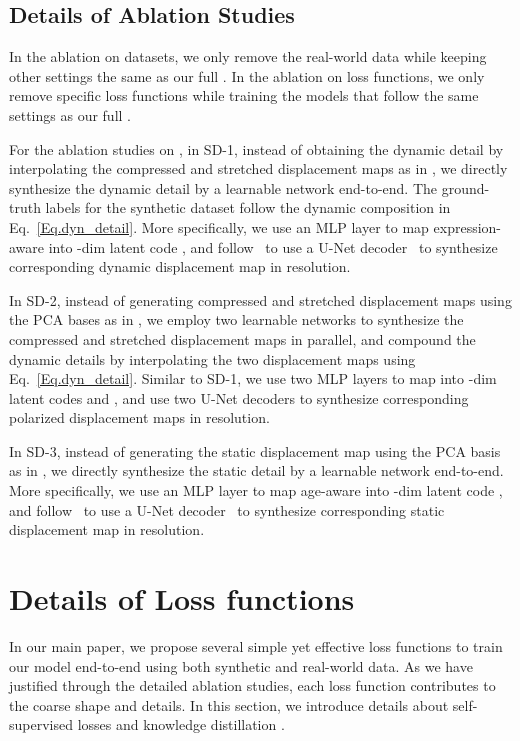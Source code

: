 \subsection{Details of Ablation Studies}


In the ablation on datasets, we only remove the real-world data while keeping other settings the same as our full {\name}. In the ablation on loss functions, we only remove specific loss functions while training the models that follow the same settings as our full {\name}.


For the ablation studies on {\module}, in SD-1, instead of obtaining the dynamic detail by interpolating the compressed and stretched displacement maps as in {\module}, we directly synthesize the dynamic detail by a learnable network end-to-end. The ground-truth labels for the synthetic dataset follow the dynamic composition in Eq.~\ref{Eq.dyn_detail}.
More specifically, we use an MLP layer to map expression-aware  into -dim latent code , and follow~ to use a U-Net decoder~ to synthesize corresponding dynamic displacement map in  resolution. 

In SD-2, instead of generating compressed and stretched displacement maps using the PCA bases as in {\module}, we employ two learnable networks to synthesize the compressed and stretched displacement maps in parallel, and compound the dynamic details by interpolating the two displacement maps using Eq.~\ref{Eq.dyn_detail}. 
Similar to SD-1, we use two MLP layers to map  into -dim latent codes  and , and use two U-Net decoders to synthesize corresponding polarized displacement maps in  resolution.

In SD-3, instead of generating the static displacement map using the PCA basis as in {\module}, we directly synthesize the static detail by a learnable network end-to-end. More specifically, we use an MLP layer to map age-aware  into -dim latent code , and follow~ to use a U-Net decoder~ to synthesize corresponding static displacement map in  resolution. 




\section{Details of Loss functions} \label{sec.supp_loss}

In our main paper, we propose several simple yet effective loss functions to train our model end-to-end using both synthetic and real-world data. As we have justified through the detailed ablation studies, each loss function contributes to the coarse shape and details. In this section, we introduce details about self-supervised losses  and knowledge distillation .


